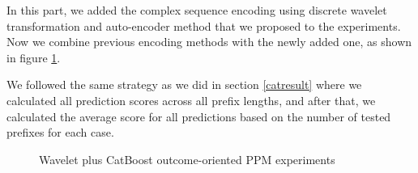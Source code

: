 In this part, we added the complex sequence encoding using discrete wavelet transformation and auto-encoder method that we proposed to the experiments. Now we combine previous encoding methods with the newly added one, as shown in figure \ref{fig:dwt2}. 

We followed the same strategy as we did in section \ref{catresult} where we calculated all prediction scores across all prefix lengths, and after that, we calculated the average score for all predictions based on the number of tested prefixes for each case. 

\begin{figure}[!htb]
	\begin{center}
		\caption{Wavelet plus CatBoost outcome-oriented PPM experiments}
		\label{fig:dwt2}
	\end{center}
\end{figure}


